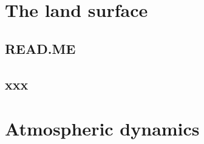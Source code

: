 \documentclass[11pt,fleqn]{book} %
\begin{document}

\cleardoublepage


\chapter{The land surface}

\hfill \break

\vspace{24mm}

\noindent


\newpage


\section*{READ.ME}



\newpage


\section{xxx}


%

\cleardoublepage


\chapter{Atmospheric dynamics}

\hfill \break

\vspace{24mm}

\noindent

\end{document}
